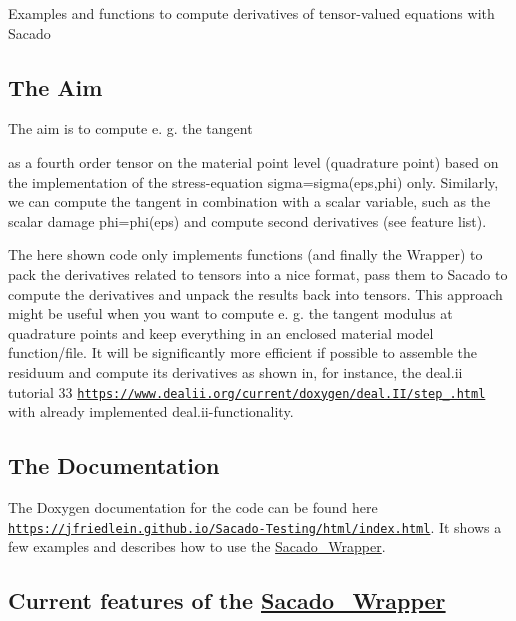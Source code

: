 Examples and functions to compute derivatives of tensor-\/valued equations with Sacado

\subsection*{The Aim}

The aim is to compute e. g. the tangent

\href{https://www.codecogs.com/eqnedit.php?latex=\overset{4}{C}&space;=&space;\frac{\partial\boldsymbol{\sigma}}{\partial\boldsymbol{\varepsilon&space;}}}{\tt }

as a fourth order tensor on the material point level (quadrature point) based on the implementation of the stress-\/equation sigma=sigma(eps,phi) only. Similarly, we can compute the tangent in combination with a scalar variable, such as the scalar damage phi=phi(eps) and compute second derivatives (see feature list).

The here shown code only implements functions (and finally the Wrapper) to pack the derivatives related to tensors into a nice format, pass them to Sacado to compute the derivatives and unpack the results back into tensors. This approach might be useful when you want to compute e. g. the tangent modulus at quadrature points and keep everything in an enclosed material model function/file. It will be significantly more efficient if possible to assemble the residuum and compute its derivatives as shown in, for instance, the deal.\+ii tutorial 33 \href{https://www.dealii.org/current/doxygen/deal.II/step_33.html}{\tt https\+://www.\+dealii.\+org/current/doxygen/deal.\+I\+I/step\+\_.\+html} with already implemented deal.\+ii-\/functionality.

\subsection*{The Documentation}

The Doxygen documentation for the code can be found here \href{https://jfriedlein.github.io/Sacado-Testing/html/index.html}{\tt https\+://jfriedlein.\+github.\+io/\+Sacado-\/\+Testing/html/index.\+html}. It shows a few examples and describes how to use the \hyperlink{namespaceSacado__Wrapper}{Sacado\+\_\+\+Wrapper}.

\subsection*{Current features of the \hyperlink{namespaceSacado__Wrapper}{Sacado\+\_\+\+Wrapper}}

